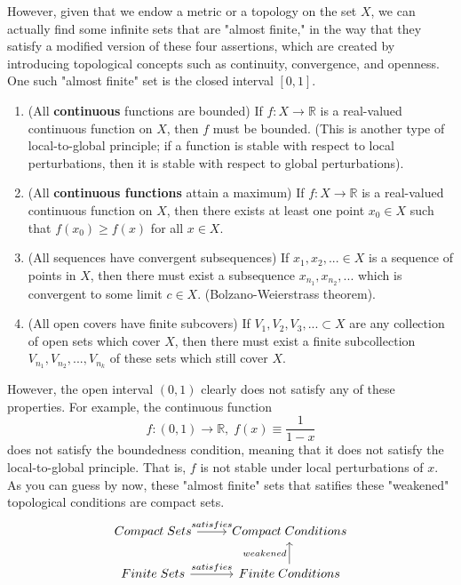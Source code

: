 \documentclass{article}
\begin{document}
    However, given that we endow a metric or a topology on the set $X$, we can actually find some infinite sets that are "almost finite," in the way that they satisfy a modified version of these four assertions, which are created by introducing topological concepts such as continuity, convergence, and openness. One such "almost finite" set is the closed interval $[0,1]$. 
    \begin{enumerate}
        \item (All \textbf{continuous} functions are bounded) If $f: X \longrightarrow \mathbb{R}$ is a real-valued continuous function on $X$, then $f$ must be bounded. (This is another type of local-to-global principle; if a function is stable with respect to local perturbations, then it is stable with respect to global perturbations).
        \item (All \textbf{continuous functions} attain a maximum) If $f: X \longrightarrow \mathbb{R}$ is a real-valued continuous function on $X$, then there exists at least one point $x_0 \in X$ such that $f(x_0) \geq f(x)$ for all $x \in X$. 
        \item (All sequences have convergent subsequences) If $x_1, x_2, ... \in X$ is a sequence of points in $X$, then there must exist a subsequence $x_{n_1}, x_{n_2}, ...$ which is convergent to some limit $c \in X$. (Bolzano-Weierstrass theorem).
        \item (All open covers have finite subcovers) If $V_1, V_2, V_3, ... \subset X$ are any collection of open sets which cover $X$, then there must exist a finite subcollection $V_{n_1}, V_{n_2}, ..., V_{n_k}$ of these sets which still cover $X$. 
    \end{enumerate}

    However, the open interval $(0,1)$ clearly does not satisfy any of these properties. For example, the continuous function 
    \[f: (0,1) \longrightarrow \mathbb{R}, \; f(x) \equiv \frac{1}{1-x}\]
    does not satisfy the boundedness condition, meaning that it does not satisfy the local-to-global principle. That is, $f$ is not stable under local perturbations of $x$. As you can guess by now, these "almost finite" sets that satifies these "weakened" topological conditions are compact sets. 
    \[\begin{tikzcd}
    Compact \;Sets \arrow{r}{satisfies} & Compact \;Conditions \\
    Finite \;Sets \arrow{r}{satisfies} & Finite \;Conditions \arrow{u}{weakened}
    \end{tikzcd}\]
\end{document}
